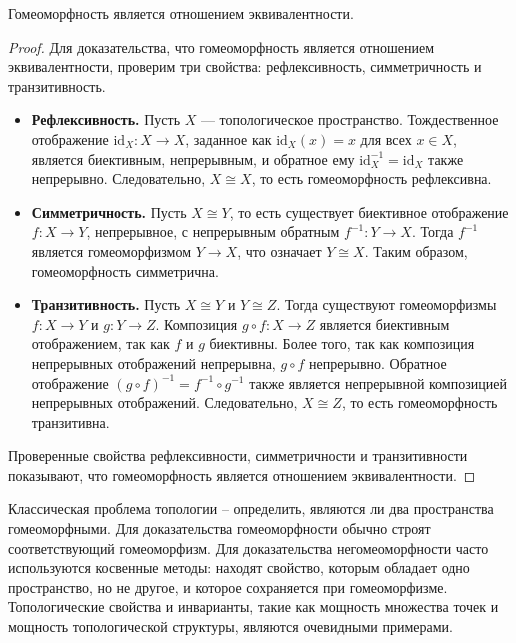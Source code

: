 \begin{statement}
	Гомеоморфность является отношением эквивалентности.
\end{statement}
\begin{proof}
	Для доказательства, что гомеоморфность является отношением эквивалентности, проверим три свойства: рефлексивность, симметричность и транзитивность.
	\begin{itemize}
		\item \textbf{Рефлексивность.} Пусть \( X \) — топологическое пространство. Тождественное отображение \( \mathrm{id}_X : X \to X \), заданное как \( \mathrm{id}_X(x) = x \) для всех \( x \in X \), является биективным, непрерывным, и обратное ему \( \mathrm{id}_X^{-1} = \mathrm{id}_X \) также непрерывно. Следовательно, \( X \cong X \), то есть гомеоморфность рефлексивна.
		\item \textbf{Симметричность.} Пусть \( X \cong Y \), то есть существует биективное отображение \( f : X \to Y \), непрерывное, с непрерывным обратным \( f^{-1} : Y \to X \). Тогда \( f^{-1} \) является гомеоморфизмом \( Y \to X \), что означает \( Y \cong X \). Таким образом, гомеоморфность симметрична.
		\item \textbf{Транзитивность.} Пусть \( X \cong Y \) и \( Y \cong Z \). Тогда существуют гомеоморфизмы \( f : X \to Y \) и \( g : Y \to Z \). Композиция \( g \circ f : X \to Z \) является биективным отображением, так как \( f \) и \( g \) биективны. Более того, так как композиция непрерывных отображений непрерывна, \( g \circ f \) непрерывно. Обратное отображение \( (g \circ f)^{-1} = f^{-1} \circ g^{-1} \) также является непрерывной композицией непрерывных отображений. Следовательно, \( X \cong Z \), то есть гомеоморфность транзитивна.
	\end{itemize}
	Проверенные свойства рефлексивности, симметричности и транзитивности показывают, что гомеоморфность является отношением эквивалентности.
\end{proof}


\begin{remark}
	Классическая проблема топологии -- определить, являются ли два пространства гомеоморфными. Для доказательства гомеоморфности обычно строят соответствующий гомеоморфизм. Для доказательства негомеоморфности часто используются косвенные методы: находят свойство, которым обладает одно пространство, но не другое, и которое сохраняется при гомеоморфизме. Топологические свойства и инварианты, такие как мощность множества точек и мощность топологической структуры, являются очевидными примерами.
\end{remark}


